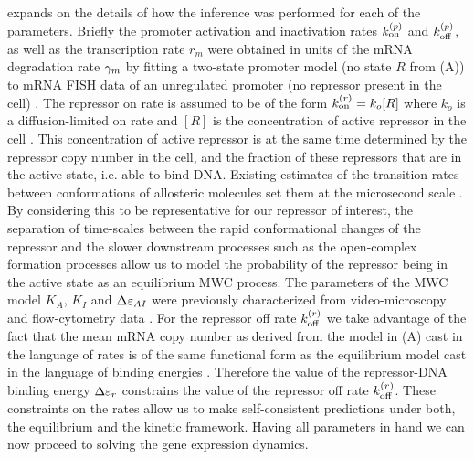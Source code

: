  expands on the details of how the inference was
performed for each of the parameters. Briefly the promoter activation and
inactivation rates $k^{(p)}_{\text{on}}$ and $k^{(p)}_{\text{off}}$, as well as the transcription rate
$r_m$ were obtained in units of the mRNA degradation rate $\gamma _m$ by fitting a
two-state promoter model (no state $R$ from (A))
\cite{Peccoud1995} to mRNA FISH data of an unregulated promoter (no  repressor
present in the cell) \cite{Jones2014a}. The repressor on rate is assumed to be
of the form $k^{(r)}_{\text{on}} = k_o [R]$ where $k_o$ is a diffusion-limited on rate and
$[R]$ is the concentration of active repressor in the cell \cite{Jones2014a}.
This concentration of active repressor is at the same time determined by the
repressor copy number in the cell, and the fraction of these repressors  that
are in the active state, i.e. able to bind DNA. Existing estimates of the
transition rates between conformations of allosteric molecules set them at the
microsecond scale \cite{Cui2008}. By considering this to be representative for
our repressor of interest, the separation of time-scales between the rapid
conformational changes of the repressor and the slower downstream processes
such as the open-complex formation processes allow us to model the probability
of the repressor being in the active state as an equilibrium MWC process. The
parameters of the MWC model $K_A$, $K_I$ and $\Delta\varepsilon_{AI}$ were previously
characterized from video-microscopy and flow-cytometry data
\cite{Razo-Mejia2018}. For the repressor off rate $k^{(r)}_{\text{off}}$ we take advantage of
the fact that the mean mRNA copy number as derived from the model in
(A) cast in the language of rates is of the same
functional form as the equilibrium model cast in the language of binding
energies \cite{Phillips2015}. Therefore the value of the repressor-DNA binding
energy $\Delta\varepsilon_r$ constrains the value of the repressor off rate $k^{(r)}_{\text{off}}$. These
constraints on the rates allow us to make self-consistent predictions under
both, the equilibrium and the kinetic framework. Having all parameters in hand
we can now proceed to solving the gene expression dynamics.

